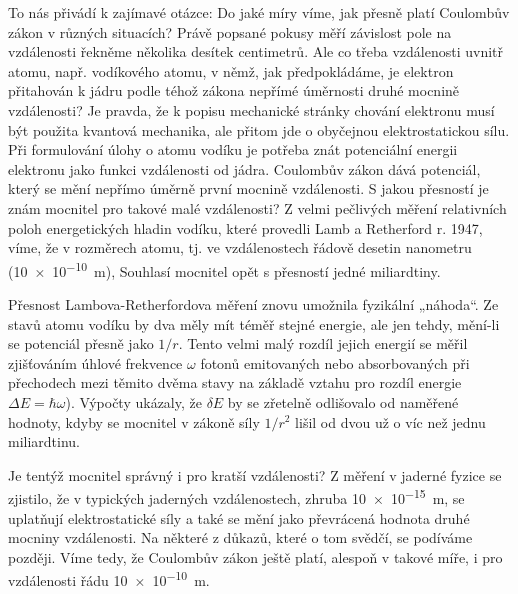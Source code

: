 {  To nás přivádí k zajímavé otázce: Do jaké míry víme, jak přesně platí Coulombův zákon v 
  různých situacích? Právě popsané pokusy měří závislost pole na vzdálenosti řekněme několika 
  desítek centimetrů. Ale co třeba vzdálenosti uvnitř atomu, např. vodíkového atomu, v němž, 
  jak předpokládáme, je elektron přitahován k jádru podle téhož zákona nepřímé úměrnosti druhé 
  mocnině vzdálenosti? Je pravda, že k popisu mechanické stránky chování elektronu musí být 
  použita kvantová mechanika, ale přitom jde o obyčejnou elektrostatickou sílu. Při formulování 
  úlohy o atomu vodíku je potřeba znát potenciální energii elektronu jako funkci vzdálenosti od 
  jádra. Coulombův zákon dává potenciál, který se mění nepřímo úměrně první mocnině 
  vzdálenosti. S jakou přesností je znám mocnitel pro takové malé vzdálenosti? Z velmi 
  pečlivých měření relativních poloh energetických hladin vodíku, které provedli Lamb a 
  Retherford r. 1947, víme, že v rozměrech atomu, tj. ve vzdálenostech řádově desetin nanometru 
  (\SI{10e-10}{\meter}), Souhlasí mocnitel opět s přesností jedné miliardtiny.
  
  Přesnost Lambova-Retherfordova měření znovu umožnila fyzikální „náhoda“. Ze stavů atomu 
  vodíku by dva měly mít téměř stejné energie, ale jen tehdy, mění-li se potenciál přesně jako 
  \(1/r\). Tento velmi malý rozdíl jejich energií se měřil zjišťováním úhlové frekvence 
  \(\omega\) fotonů emitovaných nebo absorbovaných při přechodech mezi těmito dvěma stavy na 
  základě vztahu pro rozdíl energie \(\Delta E = \si{\planckbar}\omega\)). Výpočty ukázaly, že 
  \(\delta E\) by se zřetelně odlišovalo od naměřené hodnoty, kdyby se mocnitel v zákoně síly 
  \(1/r^2\) lišil od dvou už o víc než jednu miliardtinu.
  
  Je tentýž mocnitel správný i pro kratší vzdálenosti? Z měření v jaderné fyzice se zjistilo, 
  že v typických jaderných vzdálenostech, zhruba \SI{10e-15}{\meter}, se uplatňují 
  elektrostatické síly a také se mění jako převrácená hodnota druhé mocniny vzdálenosti. Na 
  některé z důkazů, které o tom svědčí, se podíváme později. Víme tedy, že Coulombův zákon 
  ještě platí, alespoň v takové míře, i pro vzdálenosti řádu \SI{10e-10}{\meter}.
  
}
